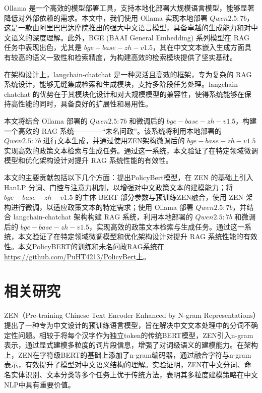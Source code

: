 \documentclass[12pt, a4paper]{ctexart}
\begin{document}
Ollama 是一个高效的模型部署工具，支持本地化部署大规模语言模型，能够显著降低对外部依赖的需求。本文中，我们使用 Ollama 实现本地部署 $Qwen2.5:7b$，这是一款由阿里巴巴达摩院推出的强大中文语言模型，具备卓越的生成能力和对中文语义的深度理解\cite{qwen2.5}。此外，BGE (BAAI General Embedding) 系列模型在 RAG 任务中表现出色，尤其是 $ bge-base-zh-v1.5 $，其在中文文本嵌入生成方面具有较高的语义一致性和检索精度，为构建高效的检索模块提供了坚实基础\cite{bgeembedding}。

在架构设计上，langchain-chatchat 是一种灵活且高效的框架，专为复杂的 RAG 系统设计，能够无缝集成检索和生成模块，支持多阶段任务处理\cite{langchainchatchat}。langchain-chatchat 的优势在于其模块化设计和对大规模模型的兼容性，使得系统能够在保持高性能的同时，具备良好的扩展性和易用性。

本文将结合 Ollama 部署的 $Qwen2.5:7b$ 和微调后的 $ bge-base-zh-v1.5 $，构建一个高效的 RAG 系统————“未名问政”。该系统将利用本地部署的 $Qwen2.5:7b$ 进行文本生成，并通过使用ZEN架构微调后的 $ bge-base-zh-v1.5 $ 实现高效的政策文本检索与生成任务。通过这一系统，本文验证了在特定领域微调模型和优化架构设计对提升 RAG 系统性能的有效性。

本文的主要贡献包括以下几个方面：提出PolicyBert模型，在 ZEN 的基础上引入 HanLP 分词、门控与注意力机制，以增强对中文政策文本的建模能力；将 $ bge-base-zh-v1.5 $ 的主体 BERT 部分参数与预训练ZEN融合，使用 ZEN 架构进行微调，以适应政策文本的特定需求；使用 Ollama 部署 $Qwen2.5:7b$，并结合 langchain-chatchat 架构构建 RAG 系统，利用本地部署的 $Qwen2.5:7b$ 和微调后的 $ bge-base-zh-v1.5 $，实现高效的政策文本检索与生成任务。通过这一系统，本文验证了在特定领域微调模型和优化架构设计对提升 RAG 系统性能的有效性。本文PolicyBERT的训练和未名问政RAG系统在\url{https://github.com/PuHT4213/PolicyBert}上。




\section{相关研究}
ZEN（Pre-training Chinese Text Encoder Enhanced by N-gram Representations）提出了一种专为中文设计的预训练语言模型，旨在解决中文文本处理中的分词不确定性问题\cite{diao-etal-2020-zen}。相较于将每个汉字作为独立token的传统BERT模型，ZEN引入n-gram表示，通过显式建模多粒度的词片段信息，增强了对词级语义的建模能力。在架构上，ZEN在字符级BERT的基础上添加了n-gram编码器，通过融合字符与n-gram表示，有效提升了模型对中文语义结构的理解。实验证明，ZEN在中文分词、命名实体识别、文本分类等多个任务上优于传统方法，表明其多粒度建模策略在中文NLP中具有重要价值。
\end{document}
